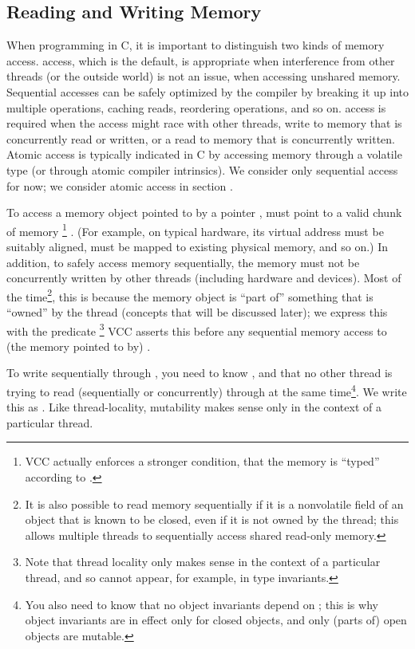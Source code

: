 \subsection{Reading and Writing Memory}
\label{sect:writes}

When programming in C, it is important to distinguish two kinds of
memory access.  access, which is the default, is appropriate when
interference from other threads (or the outside world) is not an
issue, \eg when accessing unshared memory. Sequential accesses can be
safely optimized by the compiler by breaking it up into multiple
operations, caching reads, reordering operations, and so on. 
 access is required when the access might race with other
threads, \ie write to memory that is concurrently read or written,
or a read to memory that is concurrently written. Atomic access is typically
indicated in C by accessing memory through a volatile type (or through atomic 
compiler intrinsics). We consider only sequential 
access for now; we consider atomic access in section .

To access a memory object pointed to by a pointer , 
must point to a valid chunk of memory%
\footnote{VCC actually enforces a stronger condition, that the memory
  is ``typed'' according to .
}%
. (For example, on typical hardware, its virtual address must be suitably aligned,
must be mapped to existing physical memory, and so on.) 
In addition, to safely access memory sequentially, the memory must not be concurrently
written by other threads (including hardware and devices). Most of the
time\footnote{
  It is also possible to read memory sequentially if it is a
  nonvolatile field of an object that is known to be closed, even if
  it is not owned by the thread; this allows multiple threads to
  sequentially access shared read-only memory. 
}, this is because the memory object is ``part of'' something that
is ``owned'' by the thread (concepts that will be discussed later);
we express this with the predicate 
\footnote{Note that thread locality only makes sense in
the context of a particular thread, and so cannot appear, for example,
in type invariants.} VCC asserts this 
before any sequential memory access to (the memory pointed to by) .

To write sequentially through , you need to know ,
and that no other thread is trying to read (sequentially or
concurrently) through  at the same time\footnote{
  You also need to know that no object invariants depend on ; 
  this is why object invariants are in effect only for closed objects, and only
  (parts of) open objects are mutable.
}. We write this as . Like thread-locality,
mutability makes sense only in the context of a particular thread.

